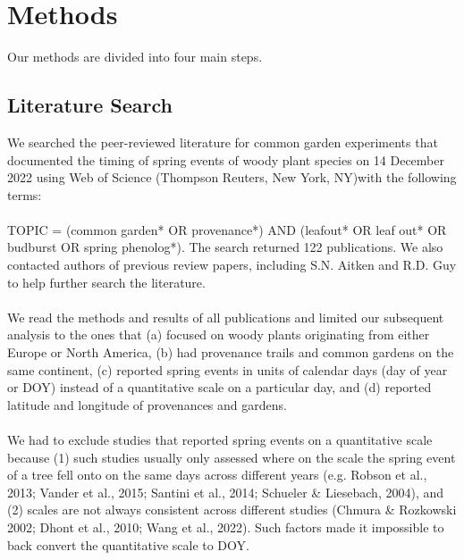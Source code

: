 \documentclass{article}
\begin{document}
\section{Methods}
Our methods are divided into four main steps. 

\subsection{Literature Search}

We searched the peer-reviewed literature for common garden experiments that documented the timing of spring events of woody plant species on 14 December 2022 using Web of Science (Thompson Reuters, New York, NY)with the following terms:
\\
\\
TOPIC = (common garden* OR provenance*) AND (leafout* OR leaf out* OR budburst OR spring phenolog*). The search returned 122 publications. We also contacted authors of previous review papers, including S.N. Aitken and R.D. Guy to help further search the literature.
\\
\\
We read the methods and results of all publications and limited our subsequent analysis to the ones that (a) focused on woody plants originating from either Europe or North America, (b) had provenance trails and common gardens on the same continent, (c) reported spring events in units of calendar days (day of year or DOY) instead of a quantitative scale on a particular day, and (d) reported latitude and longitude of provenances and gardens. 
\\
\\
We had to exclude studies that reported spring events on a quantitative scale because (1) such studies usually only assessed where on the scale the spring event of a tree fell onto on the same days across different years (e.g. Robson et al., 2013; Vander et al., 2015; Santini et al., 2014; Schueler \& Liesebach, 2004), and (2) scales are not always consistent across different studies (Chmura \& Rozkowski 2002; Dhont et al., 2010; Wang et al., 2022). Such factors made it impossible to back convert the quantitative scale to DOY.
\\
\\
\end{document}
